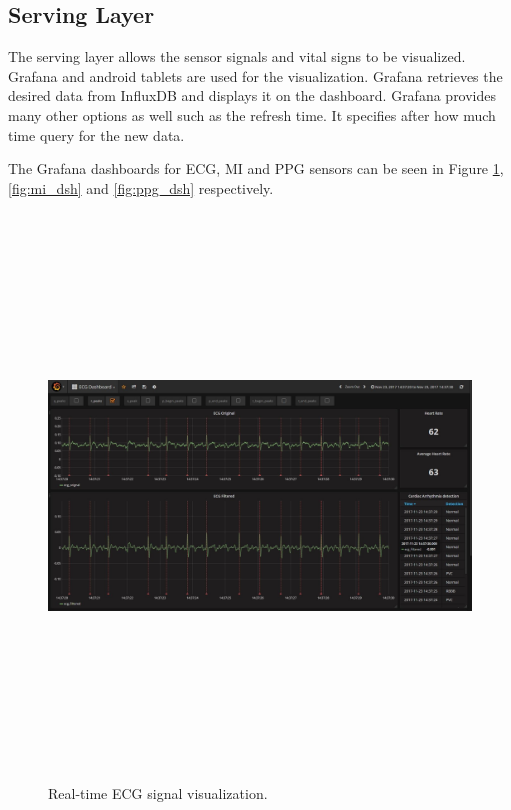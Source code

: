 \subsection{Serving Layer}
The serving layer allows the sensor signals and vital signs to be visualized. Grafana and android tablets are used for the visualization. Grafana retrieves the desired data from InfluxDB and displays it on the dashboard. Grafana provides many other options as well such as the refresh time. It specifies after how much time query for the new data. 

The Grafana dashboards for ECG, MI and PPG sensors can be seen in Figure \ref{fig:ecg_dsh}, \ref{fig:mi_dsh} and \ref{fig:ppg_dsh} respectively.


\begin{figure}[htpb]
	\centering
	\includegraphics[width=16cm,height=15cm,keepaspectratio=true]{images/ecg_dsh}
	\caption{
		Real-time ECG signal visualization.
	}
	\label{fig:ecg_dsh}
\end{figure}

